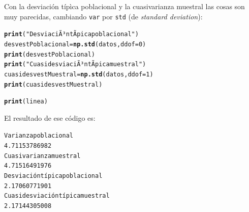 \documentclass[10pt,a4paper]{article}\usepackage[]{graphicx}\usepackage[]{color}
\makeatletter
\newcommand{\hlnum}[1]{\textcolor[rgb]{0.686,0.059,0.569}{#1}}%
\newcommand{\hlstr}[1]{\textcolor[rgb]{0.192,0.494,0.8}{#1}}%
\newcommand{\hlstd}[1]{\textcolor[rgb]{0.345,0.345,0.345}{#1}}%
\newcommand{\hlkwb}[1]{\textcolor[rgb]{0.69,0.353,0.396}{#1}}%
\newcommand{\hlkwc}[1]{\textcolor[rgb]{0.333,0.667,0.333}{#1}}%
\newcommand{\hlkwd}[1]{\textcolor[rgb]{0.737,0.353,0.396}{\textbf{#1}}}%
\newenvironment{kframe}{%
 \def\at@end@of@kframe{}%
 \ifinner\ifhmode%
  \def\at@end@of@kframe{\end{minipage}}%
  \begin{minipage}{\columnwidth}%
 \fi\fi%
 \def\FrameCommand##1{\hskip\@totalleftmargin \hskip-\fboxsep
 \colorbox{shadecolor}{##1}\hskip-\fboxsep
     \hskip-\linewidth \hskip-\@totalleftmargin \hskip\columnwidth}%
 \MakeFramed {\advance\hsize-\width
   \@totalleftmargin\z@ \linewidth\hsize
   \@setminipage}}%
 {\par\unskip\endMakeFramed%
 \at@end@of@kframe}
\newenvironment{knitrout}{}{} %
\makeatother
\begin{document}
Con la desviación típìca poblacional y la cuasivarianza muestral las cosas son muy parecidas, cambiando {\tt var} por {\tt std} (de {\em standard deviation}):
\begin{knitrout}
\color{fgcolor}\begin{kframe}
\begin{alltt}
\hlkwd{print}\hlstd{(}\hlstr{"DesviaciÃ³n tÃ­pica poblacional"}\hlstd{)}
\hlstd{desvestPoblacional} \hlkwb{=} \hlkwd{np.std}\hlstd{(datos,} \hlkwc{ddof}\hlstd{=}\hlnum{0}\hlstd{)}
\hlkwd{print}\hlstd{(desvestPoblacional)}
\hlkwd{print}\hlstd{(}\hlstr{"CuasidesviaciÃ³n tÃ­pica muestral"}\hlstd{)}
\hlstd{cuasidesvestMuestral} \hlkwb{=} \hlkwd{np.std}\hlstd{(datos,} \hlkwc{ddof}\hlstd{=}\hlnum{1}\hlstd{)}
\hlkwd{print}\hlstd{(cuasidesvestMuestral)}

\hlkwd{print}\hlstd{(linea)}
\end{alltt}
\end{kframe}
\end{knitrout}
El resultado de ese código es:
\begin{knitrout}
\color{fgcolor}\begin{kframe}
\begin{alltt}
Varianza poblacional
4.71153786982
Cuasivarianza muestral
4.71516491976
Desviación típica poblacional
2.17060771901
Cuasidesviación típica muestral
2.17144305008
\end{alltt}
\end{kframe}
\end{knitrout}
\end{document}
